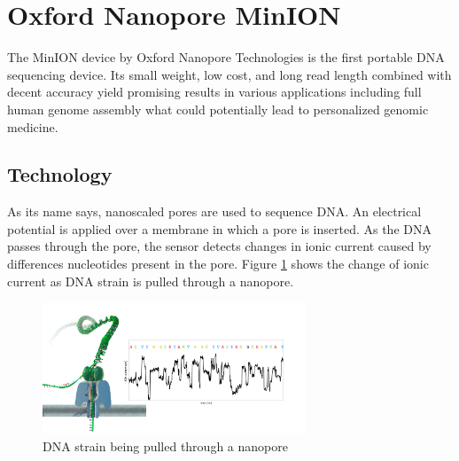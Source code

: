 \documentclass[times, utf8, diplomski, numeric, english]{fer}
\begin{document}
\section{Oxford Nanopore MinION}

The MinION device by Oxford Nanopore Technologies is the first portable DNA sequencing device. Its small weight, low cost, and long read length combined with decent accuracy yield promising results in various applications including full human genome assembly\cite{human_seq} what could potentially lead to personalized genomic medicine.

\subsection{Technology}
As its name says, nanoscaled pores are used to sequence DNA. An electrical potential is applied over a membrane in which a  pore is inserted. 
As the DNA passes through the pore, the sensor detects changes in ionic current caused by differences nucleotides present in the pore. Figure \ref{fg:nanopore} shows the change of ionic current as DNA strain is pulled through a nanopore.

\begin{figure}[!ht]
	\begin{center}
		\includegraphics[width=0.7\textwidth]{./imgs/nanopore.png}
		
		\caption[DNA strain being pulled through a nanopore]{DNA strain being pulled through a nanopore \protect\footnotemark}
		\label{fg:nanopore}
	\end{center}
\end{figure}
\end{document}
